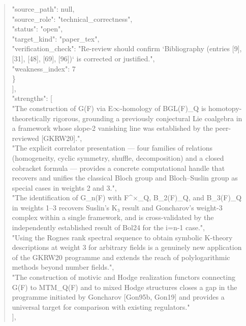 \documentclass[11pt]{article}
\begin{document}
\begin{quote}
      "source\_path": null,\\
      "source\_role": "technical\_correctness",\\
      "status": "open",\\
      "target\_kind": "paper\_tex",\\
      "verification\_check": "Re-review should confirm `Bibliography (entries [9], [31], [48], [69], [96])` is corrected or justified.",\\
      "weakness\_index": 7\\
    \}\\
  ],\\
  "strengths": [\\
    "The construction of G(F) via E\ensuremath{\infty}-homology of BGL(F)\_Q is homotopy-theoretically rigorous, grounding a previously conjectural Lie coalgebra in a framework whose slope-2 vanishing line was established by the peer-reviewed [GKRW20].",\\
    "The explicit correlator presentation --- four families of relations (homogeneity, cyclic symmetry, shuffle, decomposition) and a closed cobracket formula --- provides a concrete computational handle that recovers and unifies the classical Bloch group and Bloch--Suslin group as special cases in weights 2 and 3.",\\
    "The identification of G\_n(F) with F\^{}\ensuremath{\times}\_Q, B\_2(F)\_Q, and B\_3(F)\_Q in weights 1--3 recovers Suslin's K₃ result and Goncharov's weight-3 complex within a single framework, and is cross-validated by the independently established result of Bol24 for the i=n-1 case.",\\
    "Using the Rognes rank spectral sequence to obtain symbolic K-theory descriptions at weight 3 for arbitrary fields is a genuinely new application of the GKRW20 programme and extends the reach of polylogarithmic methods beyond number fields.",\\
    "The construction of motivic and Hodge realization functors connecting G(F) to MTM\_Q(F) and to mixed Hodge structures closes a gap in the programme initiated by Goncharov [Gon95b, Gon19] and provides a universal target for comparison with existing regulators."\\
  ],\\

\end{quote}
\end{document}
